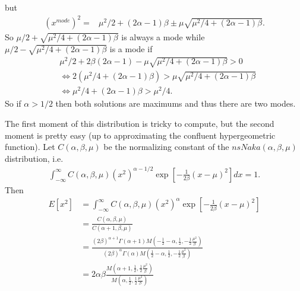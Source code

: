 \documentclass{article}\usepackage[]{graphicx}\usepackage[]{color}
\begin{document}
but
\begin{align*}
  (x^{mode})^2 = & \mu^2/2 + (2\alpha -1)\beta \pm \mu\sqrt{\mu^2/4 + (2\alpha-1)\beta}.
\end{align*}
So $\mu/2 + \sqrt{\mu^2/4 + (2\alpha -1)\beta}$ is always a mode while $\mu/2 - \sqrt{\mu^2/4 + (2\alpha -1)\beta}$ is a mode if
\begin{align*}
  &\mu^2/2  + 2\beta(2\alpha -1) - \mu\sqrt{\mu^2/4 + (2\alpha-1)\beta} >0\\
  &\iff 2\left(\mu^2/4 + (2\alpha-1)\beta\right)>\mu\sqrt{\mu^2/4 + (2\alpha-1)\beta}\\
  &\iff \mu^2/4 + (2\alpha - 1)\beta > \mu^2/4.
\end{align*}
So if $\alpha>1/2$ then both solutions are maximums and thus there are two modes.

The first moment of this distribution is tricky to compute, but the second moment is pretty easy (up to approximating the confluent hypergeometric function). Let $C(\alpha,\beta,\mu)$ be the normalizing constant of the $nsNaka(\alpha,\beta,\mu)$ distribution, i.e. 
\begin{align*}
  \int_{-\infty}^{\infty}C(\alpha,\beta,\mu)(x^2)^{\alpha-1/2}\exp\left[-\frac{1}{2\beta}(x-\mu)^2\right]dx = 1.
\end{align*}
Then
\begin{align*}
  E[x^2] &= \int_{-\infty}^{\infty}C(\alpha,\beta,\mu)(x^2)^{\alpha}\exp\left[-\frac{1}{2\beta}(x-\mu)^2\right]\\
  &= \frac{C(\alpha,\beta,\mu)}{C(\alpha+1,\beta,\mu)}\\
  & = \frac{(2\beta)^{\alpha+1}\Gamma(\alpha+1)M\left(-\frac{1}{2}-\alpha,\frac{1}{2},-\frac{1}{2}\frac{\mu^2}{\beta}\right)}{(2\beta)^\alpha\Gamma(\alpha)M\left(\frac{1}{2}-\alpha,\frac{1}{2},-\frac{1}{2}\frac{\mu^2}{\beta}\right)}\\
  & = 2\alpha\beta\frac{M\left(\alpha+1,\frac{1}{2},\frac{1}{2}\frac{\mu^2}{\beta}\right)}{M\left(\alpha,\frac{1}{2},\frac{1}{2}\frac{\mu^2}{\beta}\right)}
\end{align*}
\end{document}
